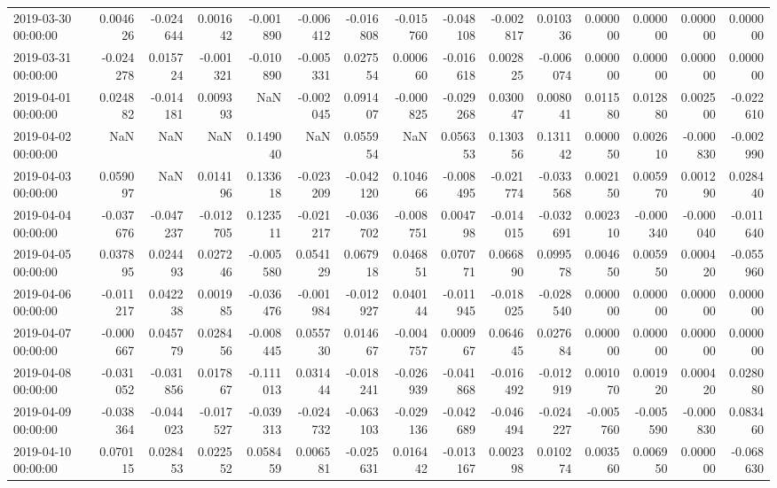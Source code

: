 \begin{tabular}{lrrrrrrrrrrrrrr}
2019-03-30 00:00:00 & 0.004626 & -0.024644 & 0.001642 & -0.001890 & -0.006412 & -0.016808 & -0.015760 & -0.048108 & -0.002817 & 0.010336 & 0.000000 & 0.000000 & 0.000000 & 0.000000 \\
2019-03-31 00:00:00 & -0.024278 & 0.015724 & -0.001321 & -0.010890 & -0.005331 & 0.027554 & 0.000660 & -0.016618 & 0.002825 & -0.006074 & 0.000000 & 0.000000 & 0.000000 & 0.000000 \\
2019-04-01 00:00:00 & 0.024882 & -0.014181 & 0.009393 & NaN & -0.002045 & 0.091407 & -0.000825 & -0.029268 & 0.030047 & 0.008041 & 0.011580 & 0.012880 & 0.002500 & -0.022610 \\
2019-04-02 00:00:00 & NaN & NaN & NaN & 0.149040 & NaN & 0.055954 & NaN & 0.056353 & 0.130356 & 0.131142 & 0.000050 & 0.002610 & -0.000830 & -0.002990 \\
2019-04-03 00:00:00 & 0.059097 & NaN & 0.014196 & 0.133618 & -0.023209 & -0.042120 & 0.104666 & -0.008495 & -0.021774 & -0.033568 & 0.002150 & 0.005970 & 0.001290 & 0.028440 \\
2019-04-04 00:00:00 & -0.037676 & -0.047237 & -0.012705 & 0.123511 & -0.021217 & -0.036702 & -0.008751 & 0.004798 & -0.014015 & -0.032691 & 0.002310 & -0.000340 & -0.000040 & -0.011640 \\
2019-04-05 00:00:00 & 0.037895 & 0.024493 & 0.027246 & -0.005580 & 0.054129 & 0.067918 & 0.046851 & 0.070771 & 0.066890 & 0.099578 & 0.004650 & 0.005950 & 0.000420 & -0.055960 \\
2019-04-06 00:00:00 & -0.011217 & 0.042238 & 0.001985 & -0.036476 & -0.001984 & -0.012927 & 0.040144 & -0.011945 & -0.018025 & -0.028540 & 0.000000 & 0.000000 & 0.000000 & 0.000000 \\
2019-04-07 00:00:00 & -0.000667 & 0.045779 & 0.028456 & -0.008445 & 0.055730 & 0.014667 & -0.004757 & 0.000967 & 0.064645 & 0.027684 & 0.000000 & 0.000000 & 0.000000 & 0.000000 \\
2019-04-08 00:00:00 & -0.031052 & -0.031856 & 0.017867 & -0.111013 & 0.031444 & -0.018241 & -0.026939 & -0.041868 & -0.016492 & -0.012919 & 0.001070 & 0.001920 & 0.000420 & 0.028080 \\
2019-04-09 00:00:00 & -0.038364 & -0.044023 & -0.017527 & -0.039313 & -0.024732 & -0.063103 & -0.029136 & -0.042689 & -0.046494 & -0.024227 & -0.005760 & -0.005590 & -0.000830 & 0.083460 \\
2019-04-10 00:00:00 & 0.070115 & 0.028453 & 0.022552 & 0.058459 & 0.006581 & -0.025631 & 0.016442 & -0.013167 & 0.002398 & 0.010274 & 0.003560 & 0.006950 & 0.000000 & -0.068630 \\

\end{tabular}
